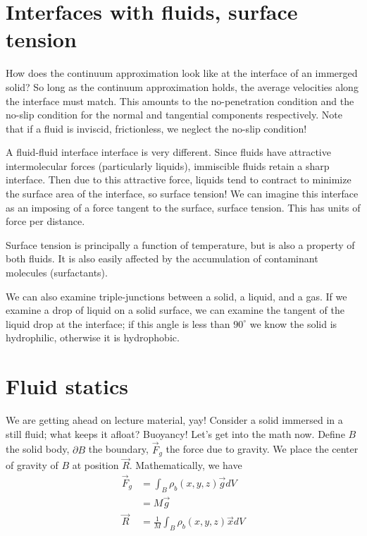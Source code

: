 \documentclass[10pt]{report}
\begin{document}
\section{Interfaces with fluids, surface tension}

How does the continuum approximation look like at the interface of an immerged solid? So long as the continuum approximation holds, the average velocities along the interface must match. This amounts to the no-penetration condition and the no-slip condition for the normal and tangential components respectively. Note that if a fluid is inviscid, frictionless, we neglect the no-slip condition!

A fluid-fluid interface interface is very different. Since fluids have attractive intermolecular forces (particularly liquids), immiscible fluids retain a sharp interface. Then due to this attractive force, liquids tend to contract to minimize the surface area of the interface, so surface tension! We can imagine this interface as an imposing of a force tangent to the surface, surface tension. This has units of force per distance.

Surface tension is principally a function of temperature, but is also a property of both fluids. It is also easily affected by the accumulation of contaminant molecules (surfactants).

We can also examine triple-junctions between a solid, a liquid, and a gas. If we examine a drop of liquid on a solid surface, we can examine the tangent of the liquid drop at the interface; if this angle is less than $90^\circ$ we know the solid is hydrophilic, otherwise it is hydrophobic.

\section{Fluid statics}

We are getting ahead on lecture material, yay! Consider a solid immersed in a still fluid; what keeps it afloat? Buoyancy! Let's get into the math now. Define $B$ the solid body, $\partial B$ the boundary, $\vec{F}_g$ the force due to gravity. We place the center of gravity of $B$ at position $\vec{R}$. Mathematically, we have
\begin{align}
    \vec{F}_g &= \int_B \rho_b(x,y,z) \vec{g} dV\\
    &= M\vec{g}\\
    \vec{R} &= \frac{1}{M}\int_B \rho_b(x,y,z) \vec{x} dV
\end{align}
\end{document}
